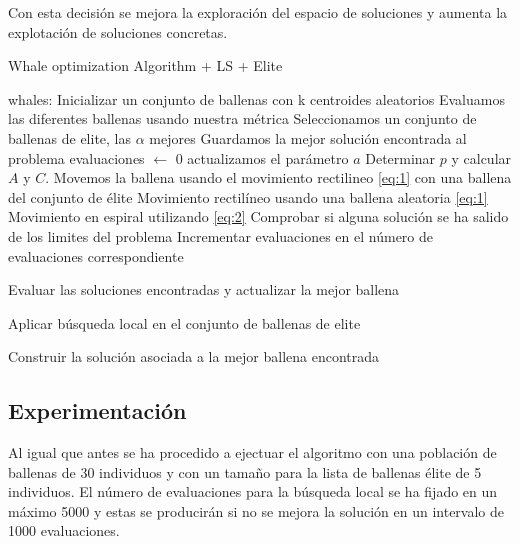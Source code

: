 \documentclass[11pt]{article}
\begin{document}
Con esta decisión se mejora la exploración del espacio de soluciones y aumenta
la explotación de soluciones concretas.

\begin{algorithm}[H]
  \caption{Whale optimization Algorithm + LS + Elite}
  \label{alg-lsearch}
  \begin{algorithmic}[1]
    \State whales: Inicializar un conjunto de ballenas con k centroides aleatorios
    \State Evaluamos las diferentes ballenas usando nuestra métrica 
    \State Seleccionamos un conjunto de ballenas de elite, las $\alpha$ mejores
    \State Guardamos la mejor solución encontrada al problema
    \State evaluaciones $\leftarrow$ 0
    \State actualizamos el parámetro $a$
    \State Determinar $p$ y calcular  $A$ y $C$.
    \State Movemos la ballena usando el movimiento rectilineo \eqref{eq:1} con una ballena del conjunto de élite
    \State Movimiento rectilíneo usando una ballena aleatoria \eqref{eq:1}
    \EndIf
    \Else
    \State Movimiento en espiral utilizando \eqref{eq:2}
    \EndIf
    \EndFor 
    \State Comprobar si alguna solución se ha salido de los limites del problema
    \State Incrementar evaluaciones en el número de evaluaciones correspondiente
    
    \State Evaluar las soluciones encontradas y actualizar la mejor ballena 

    \State Aplicar búsqueda local en el conjunto de ballenas de elite
    \EndIf

    \EndWhile
    \State
    \Return Construir la solución asociada a la mejor ballena encontrada
    \EndProcedure
  \end{algorithmic}
\end{algorithm}

\subsection{Experimentación}

Al igual que antes se ha procedido a ejectuar el algoritmo con una población de
ballenas  de 30 individuos y con un tamaño para la lista de ballenas élite de 5
individuos. El número de evaluaciones para la búsqueda local se ha fijado en un
máximo 5000 y estas se producirán si no se mejora la solución en un intervalo de
1000 evaluaciones.
\end{document}
